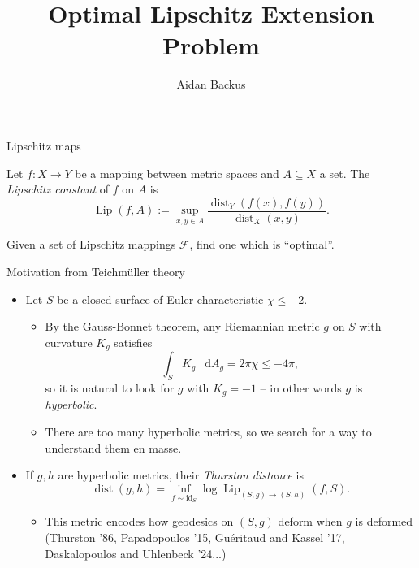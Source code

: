 \documentclass[10pt]{beamer}
\title{Optimal Lipschitz Extension Problem}
\author{Aidan Backus}
\newcommand*\dif{\mathop{}\!\mathrm{d}}
\DeclareMathOperator{\dist}{dist}
\DeclareMathOperator{\Lip}{Lip}
\newcommand{\id}{\mathrm{id}}
\begin{document}
\frame{\titlepage}

\begin{frame}{Lipschitz maps}
\begin{definition}
Let $f: X \to Y$ be a mapping between metric spaces and $A \subseteq X$ a set.
The \emph{Lipschitz constant} of $f$ on $A$ is
$$\Lip(f, A) := \sup_{x, y \in A} \frac{\dist_Y(f(x), f(y))}{\dist_X(x, y)}.$$
\end{definition}
 
\begin{problem}
Given a set of Lipschitz mappings $\mathscr F$, find one which is ``optimal''.
\end{problem}
\end{frame}

\begin{frame}{Motivation from Teichm\"uller theory}
\begin{itemize}
\item Let $S$ be a closed surface of Euler characteristic $\chi \leq -2$. 
\begin{itemize}
\item By the Gauss-Bonnet theorem, any Riemannian metric $g$ on $S$ with curvature $K_g$ satisfies 
$$\int_S K_g ~\dif A_g = 2\pi \chi \leq -4\pi,$$
so it is natural to look for $g$ with $K_g = -1$ -- in other words $g$ is \emph{hyperbolic}.
\item There are too many hyperbolic metrics, so we search for a way to understand them en masse. 
\end{itemize}
\item If $g, h$ are hyperbolic metrics, their \emph{Thurston distance} is
$$\dist(g, h) = \inf_{f \sim \id_S} \log \Lip_{(S, g) \to (S, h)}(f, S).$$
\begin{itemize}
\item This metric encodes how geodesics on $(S, g)$ deform when $g$ is deformed (Thurston '86, Papadopoulos '15, Gu\'eritaud and Kassel '17, Daskalopoulos and Uhlenbeck '24...) 
\end{itemize}
\end{itemize}
\end{frame}
\end{document}
